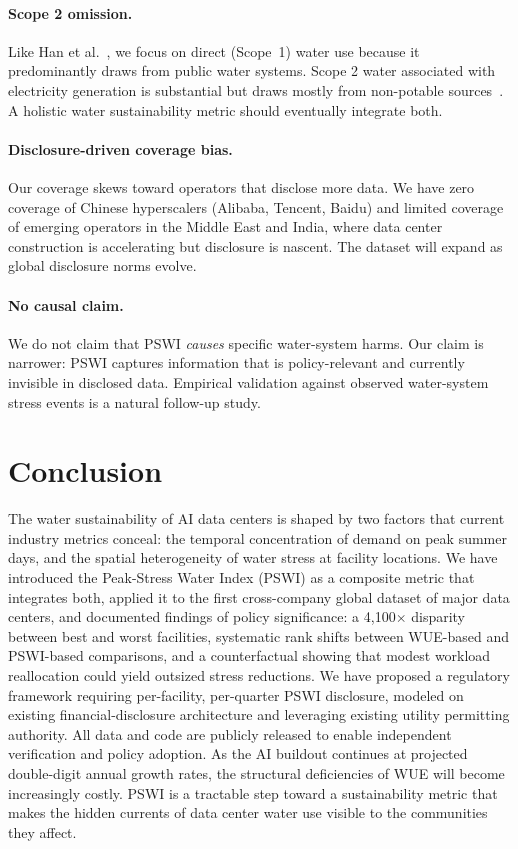 \documentclass[conference,10pt]{IEEEtran}
\begin{document}
\paragraph{Scope 2 omission.}
Like Han et al.~\cite{han2026}, we focus on direct (Scope~1) water use
because it predominantly draws from public water systems. Scope 2
water associated with electricity generation is substantial but draws
mostly from non-potable sources~\cite{li2023thirsty}. A holistic water
sustainability metric should eventually integrate both.

\paragraph{Disclosure-driven coverage bias.}
Our coverage skews toward operators that disclose more data. We have
zero coverage of Chinese hyperscalers (Alibaba, Tencent, Baidu) and
limited coverage of emerging operators in the Middle East and India,
where data center construction is accelerating but disclosure is
nascent. The dataset will expand as global disclosure norms evolve.

\paragraph{No causal claim.}
We do not claim that PSWI \emph{causes} specific water-system harms.
Our claim is narrower: PSWI captures information that is policy-relevant
and currently invisible in disclosed data. Empirical validation against
observed water-system stress events is a natural follow-up study.

\section{Conclusion}
\label{sec:conclusion}

The water sustainability of AI data centers is shaped by two factors
that current industry metrics conceal: the temporal concentration of
demand on peak summer days, and the spatial heterogeneity of water
stress at facility locations. We have introduced the Peak-Stress Water
Index (PSWI) as a composite metric that integrates both, applied it to
the first cross-company global dataset of major data centers, and
documented findings of policy significance: a 4{,}100$\times$ disparity
between best and worst facilities, systematic rank shifts between
WUE-based and PSWI-based comparisons, and a counterfactual showing
that modest workload reallocation could yield outsized stress
reductions. We have proposed a regulatory framework requiring
per-facility, per-quarter PSWI disclosure, modeled on existing
financial-disclosure architecture and leveraging existing utility
permitting authority. All data and code are publicly released to
enable independent verification and policy adoption. As the AI buildout
continues at projected double-digit annual growth rates, the structural
deficiencies of WUE will become increasingly costly. PSWI is a tractable
step toward a sustainability metric that makes the hidden currents of
data center water use visible to the communities they affect.
\end{document}
